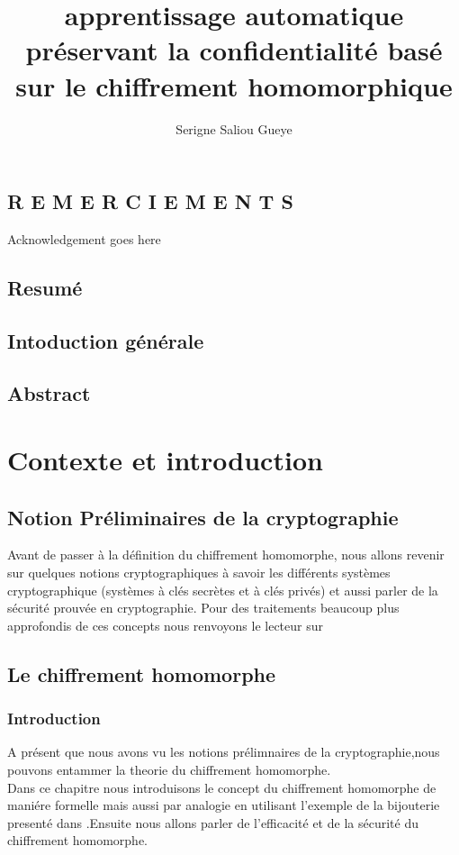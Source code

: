 \documentclass[12pt,a4paper]{report}
\title{apprentissage automatique préservant la confidentialité basé sur le chiffrement  homomorphique}
\author{Serigne Saliou Gueye }
\begin{document}
\chapter*{R E M E R C I E M E N T S}
Acknowledgement goes here
\chapter*{Resumé}
\chapter*{Intoduction générale}
\chapter*{Abstract}
\tableofcontents

\part{Contexte et introduction}
\chapter{Notion Préliminaires de la cryptographie}
Avant de passer à la définition du chiffrement homomorphe, nous allons revenir sur quelques notions cryptographiques à savoir les différents systèmes cryptographique (systèmes à clés secrètes et à clés privés) et aussi parler de la sécurité prouvée en cryptographie. Pour des traitements beaucoup plus approfondis de ces concepts nous renvoyons le lecteur sur \cite{1}

\chapter{Le chiffrement homomorphe}
\section{Introduction}
A présent que nous avons vu les notions prélimnaires de la cryptographie,nous pouvons entammer  la theorie du chiffrement homomorphe.\\
Dans ce chapitre nous introduisons le concept du chiffrement homomorphe de maniére formelle mais aussi par analogie en utilisant  l'exemple  de la  bijouterie presenté dans \cite{3} .Ensuite nous allons parler de l'efficacité et de la sécurité du chiffrement homomorphe.\\

\\
\\
\end{document}
